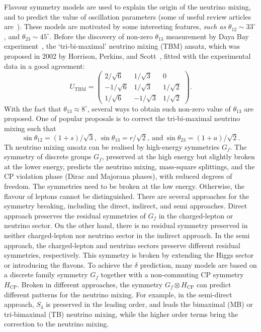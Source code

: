\documentclass[aps,prd,nofootinbib,preprint]{revtex4}
\begin{document}
Flavour symmetry models are used to explain the origin of the neutrino mixing, and to predict the value of oscillation parameters (some of useful review articles are~\cite{Altarelli:2010gt,Ishimori:2010au,King:2013eh,King:2014nza,King:2015aea,King:2015ata,King:2017guk}). These models are motivated by some interesting features, \textit{such as} $\theta_{12}\sim 33^\circ$, and $\theta_{23}\sim 45^\circ$. Before the discovery of non-zero $\theta_{13}$ measurement by Daya Bay experiment~\cite{An:2013zwz}, the `tri-bi-maximal' neutrino mixing (TBM) ansatz, which was proposed in 2002 by Horrison, Perkins, and Scott~\cite{Harrison:2002er}, fitted with the experimental data in a good agreement:
\begin{equation*}
U_{\text{TBM}}=\left(
\begin{array}{ccc}
2/\sqrt{6} & 1/\sqrt{3} & 0\\
-1/\sqrt{6} & 1/\sqrt{3} & 1/\sqrt{2}\\
1/\sqrt{6}  & -1/\sqrt{3} & 1/\sqrt{2}
\end{array}\right).
\end{equation*} 
With the fact that $\theta_{13}\approx 8^\circ$, several ways to obtain such non-zero value of $\theta_{13}$ are proposed. One of popular proposals is to correct the tri-bi-maximal neutrino mixing such that 
\begin{equation*}
\sin\theta_{12}=(1+s)/\sqrt{3},~\sin\theta_{13}=r/\sqrt{2},~\text{and}~\sin\theta_{23}=(1+a)/\sqrt{2}.
\end{equation*}
Th neutrino mixing ansatz can be realised by high-energy symmetries $G_f$.
The symmetry of discrete groups $G_f$, preserved at the high energy but slightly broken at the lower energy, predicts the neutrino mixing, mass-square splittings, and the CP violation phase (Dirac and Majorana phases), with reduced degrees of freedom. 
The symmetries need to be broken at the low energy. Otherwise, the flavour of leptons cannot be distinguished. There are several approaches for the symmetry breaking, including the direct, indirect, and semi approaches. Direct approach preserves the residual symmetries of $G_f$ in the charged-lepton or neutrino sector. On the other hand, there is no residual symmetry preserved in neither charged-lepton nor neutrino sector in the indirect approach. In the semi approach, the charged-lepton and neutrino sectors preserve different residual symmetries, respectively. This symmetry is broken by extending the Higgs sector or introducing the flavons.
%
To achieve the $\delta$ prediction, many models are based on a discrete family symmetry $G_f$ together with a non-commuting CP symmetry $H_\mathrm{CP}$. Broken in different approaches, the symmetry $G_f\otimes H_\mathrm{CP}$ can predict different patterns for the neutrino mixing. For example, in the semi-direct approach, $S_4$ is preserved in the leading order, and leads the bimaximal (MB) or tri-bimaximal (TB) neutrino mixing, while the higher order terms bring the correction to the neutrino mixing.
\end{document}
